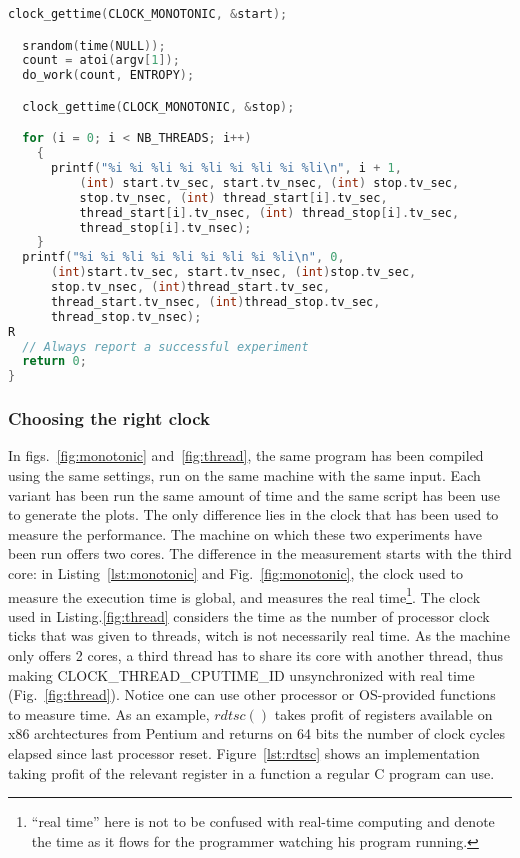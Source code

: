 \begin{lstlisting}[caption={$clock\_gettime()$ before and after the portion of code being monitored collects the necessary data to compute the time used to run this portion of a program.},label={lst:instrumentation},language=C]
  clock_gettime(CLOCK_MONOTONIC, &start);

  srandom(time(NULL));
  count = atoi(argv[1]);
  do_work(count, ENTROPY);

  clock_gettime(CLOCK_MONOTONIC, &stop);

  for (i = 0; i < NB_THREADS; i++)
    {
      printf("%i %i %li %i %li %i %li %i %li\n", i + 1,
          (int) start.tv_sec, start.tv_nsec, (int) stop.tv_sec,
          stop.tv_nsec, (int) thread_start[i].tv_sec,
          thread_start[i].tv_nsec, (int) thread_stop[i].tv_sec,
          thread_stop[i].tv_nsec);
    }
  printf("%i %i %li %i %li %i %li %i %li\n", 0,
      (int)start.tv_sec, start.tv_nsec, (int)stop.tv_sec,
      stop.tv_nsec, (int)thread_start.tv_sec,
      thread_start.tv_nsec, (int)thread_stop.tv_sec,
      thread_stop.tv_nsec);
R
  // Always report a successful experiment
  return 0;
}
\end{lstlisting}

\subsubsection{Choosing the right clock}
\label{app:clock}

In figs.~\ref{fig:monotonic} and~\ref{fig:thread}, the same program has been compiled using the same settings, run on the same machine with the same input. Each variant has been run the same amount of time and the same script has been use to generate the plots. The only difference lies in the clock that has been used to measure the performance. The machine on which these two experiments have been run offers two cores. The difference in the measurement starts with the third core: in Listing~\ref{lst:monotonic} and Fig.~\ref{fig:monotonic}, the clock used to measure the execution time is global, and measures the real time\footnote{``real time'' here is not to be confused with real-time computing and denote the time as it flows for the programmer watching his program running.}. The clock used in Listing.\ref{fig:thread} considers the time as the number of processor clock ticks that was given to threads, witch is not necessarily real time. As the machine only offers 2 cores, a third thread has to share its core with another thread, thus making CLOCK\_THREAD\_CPUTIME\_ID unsynchronized with real time (Fig.~\ref{fig:thread}). Notice one can use other processor or OS-provided functions to measure time. As an example, $rdtsc()$ takes profit of registers available on x86 archtectures from Pentium and returns on 64 bits the number of clock cycles elapsed since last processor reset. Figure~\ref{lst:rdtsc} shows an implementation taking profit of the relevant register in a function a regular C program can use.



